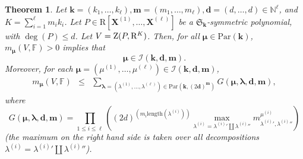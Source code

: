 \documentclass{amsart}
\newtheorem{theorem}{Theorem}
\theoremstyle{definition}
\theoremstyle{remark}
\numberwithin{equation}{section}
\begin{document}
\begin{theorem}
\label{thm:main-product-of-symmetric}
Let ${\mathbf{k}}=(k_1,\ldots,k_\ell),
{\mathbf{m}} =(m_1,\ldots,m_\ell), 
{\mathbf{d}}=(d,\ldots,d) \in {\mathbb{N}}^\ell$, and $K = \sum_{i=1}^{\ell} m_i k_i$.
Let 
$P \in {\mathrm{R}}[{\mathbf{X}}^{(1)},\ldots,{\mathbf{X}}^{(\ell)}]$
be a $\mathfrak{S}_{\mathbf{k}}$-symmetric polynomial, 
with $\deg(P) \leq d$. Let  $V = {{\rm Z}}(P,{\mathrm{R}}^K)$.
Then, for all $\pmb{\mu} \in {\mathrm{Par}}({\mathbf{k}})$,  $m_{\pmb{\mu}}(V,{\mathbb{F}}) > 0$ implies that
\begin{equation}
\label{eqn:restriction-on-specht}
\pmb{\mu} \in 
\mathcal{I}({\mathbf{k}},{\mathbf{d}},{\mathbf{m}}).
\end{equation}
Moreover, for each  $\pmb{\mu} = (\mu^{(1)},\ldots,\mu^{(\ell)}) \in \mathcal{I}({\mathbf{k}},{\mathbf{d}},{\mathbf{m}})$,  
\begin{eqnarray*}
  m_{\pmb{\mu}}(V,{\mathbb{F}}) &\leq& 
\sum_{\pmb{\lambda}=(\lambda^{(1)},\ldots,\lambda^{(\ell)})\in {\mathrm{Par}}({\mathbf{k}}, (2{\mathbf{d}})^{\mathbf{m}})}
G(\pmb{\mu},\pmb{\lambda},{\mathbf{d}},{\mathbf{m}}),
\end{eqnarray*}
where 
\[
G(\pmb{\mu},\pmb{\lambda},{\mathbf{d}},{\mathbf{m}}) =
\prod_{1 \leq i \leq \ell}
\left(
 (2 d)^{(m_i{\mathrm{length}}(\lambda^{(i)}))}
 \max_{\lambda^{(i)} = {\lambda^{(i)}}' \coprod {\lambda^{(i)}}''}
 m^{\mu^{(i)}}_{{\lambda^{(i)}}',{\lambda^{(i)}}''}
 \right)
 \]
(the maximum on the right hand side is taken over all decompositions
$\lambda^{(i)} = {\lambda^{(i)}}' \coprod {\lambda^{(i)}}''$). 
\end{theorem}
\end{document}
